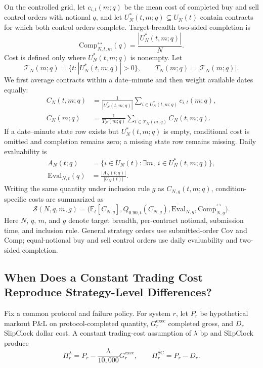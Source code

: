 \documentclass[sigconf]{acmart}
\begin{document}
On the controlled grid, let $c_{i,t}(m;q)$ be the mean cost of completed buy and sell control orders with notional $q$, and let $U_N^\ast(t,m;q)\subseteq U_N(t)$ contain contracts for which both control orders complete. Target-breadth two-sided completion is
\[
\mathrm{Comp}^{\leftrightarrow}_{N,t,m}(q)
=\frac{|U_N^\ast(t,m;q)|}{N}.
\]
Cost is defined only where $U_N^\ast(t,m;q)$ is nonempty. Let
\[
\mathcal T_N(m;q)=\{t:|U_N^\ast(t,m;q)|>0\},
\qquad T_N(m;q)=|\mathcal T_N(m;q)|.
\]
We first average contracts within a date--minute and then weight available dates equally:
\begin{equation}
\begin{aligned}
C_N(t,m;q)&=\frac{1}{|U_N^\ast(t,m;q)|}
\sum_{i\in U_N^\ast(t,m;q)}c_{i,t}(m;q),\\
\bar C_N(m;q)&=\frac{1}{T_N(m;q)}
\sum_{t\in\mathcal T_N(m;q)} C_N(t,m;q).
\end{aligned}
\end{equation}
If a date--minute state row exists but $U_N^\ast(t,m;q)$ is empty, conditional cost is omitted and completion remains zero; a missing state row remains missing. Daily evaluability is
\[
\begin{aligned}
A_N(t;q)&=\{i\in U_N(t):\exists m,\ i\in U_N^\ast(t,m;q)\},\\
\mathrm{Eval}_{N,t}(q)&=\frac{|A_N(t;q)|}{|U_N(t)|}.
\end{aligned}
\]
Writing the same quantity under inclusion rule $g$ as $C_{N,g}(t,m;q)$, condition-specific costs are summarized as
\begin{equation}
\mathcal S(N,q,m,g)=\big(\mathbb E_t[C_{N,g}],Q_{0.90,t}(C_{N,g}),
\overline{\mathrm{Eval}}_{N,g},\overline{\mathrm{Comp}}^{\leftrightarrow}_{N,g}\big).
\end{equation}
Here $N$, $q$, $m$, and $g$ denote target breadth, per-contract notional, submission time, and inclusion rule. General strategy orders use submitted-order $\mathrm{Cov}$ and $\mathrm{Comp}$; equal-notional buy and sell control orders use daily evaluability and two-sided completion.

\subsection{When Does a Constant Trading Cost Reproduce Strategy-Level Differences?}
Fix a common protocol and failure policy. For system $r$, let $P_r$ be hypothetical markout P\&L on protocol-completed quantity, $G^{\mathrm{exec}}_r$ completed gross, and $D_r$ SlipClock dollar cost. A constant trading-cost assumption of $\lambda$ bp and SlipClock produce
\begin{equation}
\Pi_r^{\lambda}=P_r-\frac{\lambda}{10{,}000}G^{\mathrm{exec}}_r,
\qquad \Pi_r^{\mathrm{SC}}=P_r-D_r.
\end{equation}
\end{document}
